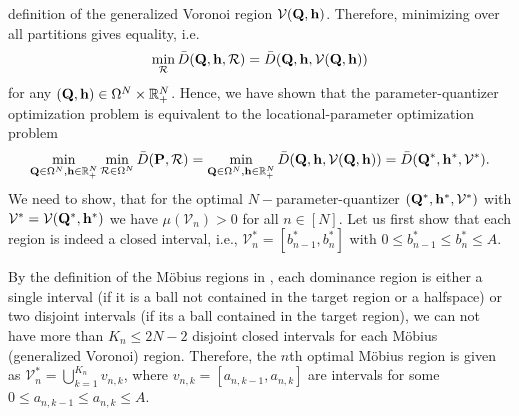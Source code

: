 \documentclass[smallabstract,smallcaptions]{dccpaper}
\renewcommand{\vQ}{\mathbf P}
\renewcommand{\vP}{\mathbf Q}
\newcommand{\Vor}{\ensuremath{\mathcal{V}}}         %
\newcommand{\Rset}{\ensuremath{\mathcal R}}
\newcommand{\Dis}{\ensuremath{D}}                    %
\newcommand{\AvDis}{\ensuremath{\bar{\Dis}}}         %
\begin{document}
  definition of the generalized Voronoi region $\Vor(\vP,\vh)$. Therefore, minimizing over all partitions gives equality, i.e.
  \begin{align}
    \min_{\Rset} \AvDis(\vP,\vh,\Rset)=\AvDis(\vP,\vh,\Vor(\vP,\vh))
  \end{align}
  for any $(\vP,\vh)\in\Ome^N\times\R_+^N$.
  Hence, we have shown that the parameter-quantizer optimization problem is equivalent to the locational-parameter
  optimization problem
  \begin{align}
    \min_{\vP\in\Ome^N,\vh\in\R_+^N} \min_{\Rset\in\Ome^N} \AvDis(\vQ,\Rset) 
    = \min_{\vP\in\Ome^N,\vh\in\R_+^N} \AvDis(\vP,\vh,\Vor(\vP,\vh))=\AvDis(\vP^*,\vh^*,\Vor^*).\label{eq:optquanteqoptdeploy2}
  \end{align}
  We need to show, that for the optimal $N-$parameter-quantizer $(\vP^*,\vh^*,\Vor^*)$ with $\Vor^*=\Vor(\vP^*,\vh^*)$
  we have $\mu(\Vor_n)>0$ for all $n\in[N]$.  Let us first show that each region is indeed a closed interval, i.e.,
  $\Vor_n^*=[b^*_{n-1},b^*_n]$ with $0\leq b^*_{n-1}\leq b^*_n\leq A$. 
  
  By the definition of the Möbius regions in , each dominance region is either a single interval
  (if it is a ball not contained in the target region or a halfspace) or two disjoint intervals (if its a ball contained
  in the target region), we can not have more than $K_n\leq 2N-2$ disjoint closed intervals for each Möbius (generalized
  Voronoi) region.  Therefore, the $n$th optimal Möbius region is given as $\Vor^*_n=\bigcup_{k=1}^{K_n}v_{n,k}$, where
  $v_{n,k}=[a_{n,k-1},a_{n,k}]$ are intervals for some $0\leq a_{n,k-1}\leq a_{n,k}\leq A$.
\end{document}
